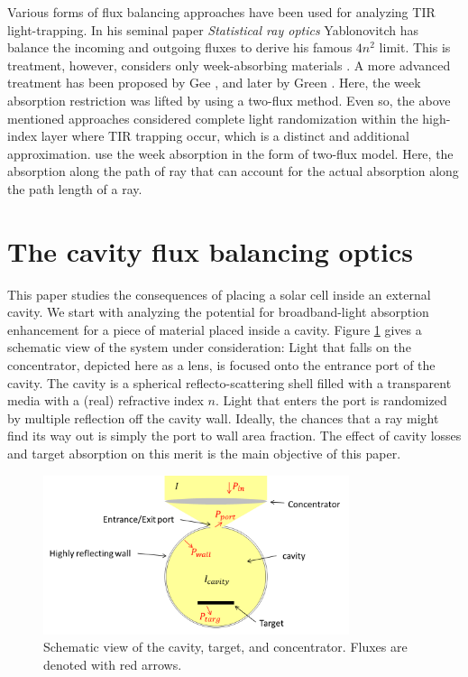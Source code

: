 \documentclass[a4paper]{article}
\begin{document}
\par Various forms of flux balancing approaches have been used for analyzing TIR light-trapping. In his seminal paper \emph{Statistical ray optics} Yablonovitch has balance the incoming and outgoing fluxes to derive his famous $4n^2$ limit. This is treatment, however, considers only week-absorbing materials \cite{Yablonovitch82josa}. A more advanced treatment has been proposed by Gee \cite{Gee1988}, and later by Green \cite{Green2002}. Here, the week absorption restriction was lifted by using a two-flux method. Even so, the above mentioned approaches considered complete light randomization within the high-index layer where TIR trapping occur, which is a distinct and additional approximation.  use the week absorption  in the form of two-flux model. Here, the absorption along the path of ray  that can account for the actual absorption along the path length of a ray.
 
\listoftodos\bigskip
\section{The cavity flux balancing optics}

\noindent This paper studies the consequences of placing a solar cell inside an external cavity. We start with analyzing the potential for broadband-light absorption enhancement for a piece of material placed inside a cavity. Figure \ref{fig:sys} gives a schematic view of the system under consideration: Light that falls on the concentrator, depicted here as a lens, is focused onto the entrance port of the cavity. The cavity is a spherical reflecto-scattering shell filled with a transparent media with a (real) refractive index $n$. Light that enters the port is randomized by multiple reflection off the cavity wall. Ideally, the chances that a ray might find its way out is simply the port to wall area fraction. The effect of cavity losses and target absorption on this merit is the main objective of this paper.
\par

\begin{figure}
\centering
\includegraphics[width=0.8\textwidth]{figures/cav3.png}
\caption{Schematic view of the cavity, target, and concentrator. Fluxes are denoted with red arrows.}
\label{fig:sys}
\end{figure}
\end{document}
